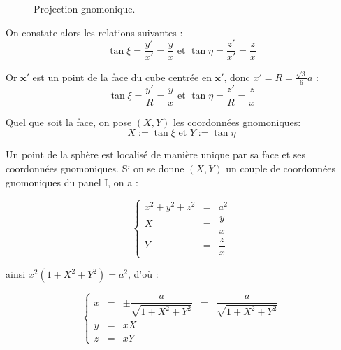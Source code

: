\begin{figure}[htbp]
\begin{center}
\end{center}
\caption{Projection gnomonique.}
\label{fig: projection gnomonique}
\end{figure}  

On constate alors les relations suivantes :
\begin{equation}
\tan \xi = \dfrac{y'}{x'} = \dfrac{y}{x} \text{ et } \tan \eta = \dfrac{z'}{x'} = \dfrac{z}{x}
\end{equation}

Or $\mathbf{x}'$ est un point de la face du cube centrée en $\mathbf{x}'$, donc $x'=R=\frac{\sqrt{3}}{6}a$ :
\begin{equation}
\tan \xi = \dfrac{y'}{R} = \dfrac{y}{x} \text{ et } \tan \eta = \dfrac{z'}{R} = \dfrac{z}{x}
\end{equation}

Quel que soit la face, on pose $(X,Y)$ les coordonnées gnomoniques:
\begin{equation}
X:=\tan \xi \text{ et } Y:= \tan \eta
\end{equation}

Un point de la sphère est localisé de manière unique par sa face et ses coordonnées gnomoniques. Si on se donne $(X,Y)$ un couple de coordonnées gnomoniques du panel I, on a :

\begin{equation}
\left\lbrace
\begin{array}{rcl}
x^2+y^2+z^2 & = & a^2\\
X & = & \dfrac{y}{x} \\
Y & = & \dfrac{z}{x}
\end{array}
\right.
\end{equation}

ainsi $x^2 \left( 1+X^2+Y^2 \right) = a^2$, d'où :

\begin{equation}
\left\lbrace
\begin{array}{rclcl}
x & = & \pm \dfrac{a}{\sqrt{1+X^2+Y^2}}& = & \dfrac{a}{\sqrt{1+X^2+Y^2}}\\
y & = & xX &&\\
z & = & xY &&
\end{array}
\right.
\end{equation}

